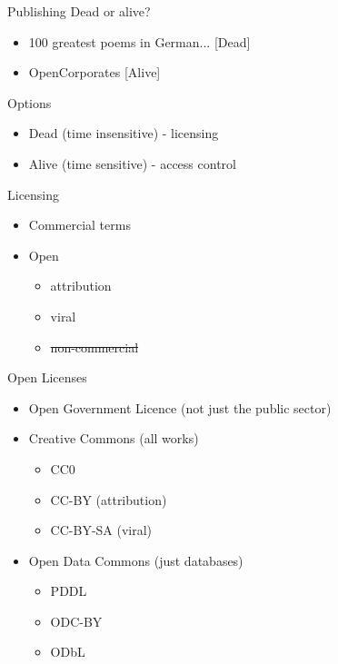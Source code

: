 \documentclass{beamer}
\begin{document}
\begin{frame}{Publishing}
Dead or alive?
\begin{itemize}
\item 100 greatest poems in German... [Dead]
\item OpenCorporates [Alive]
\end{itemize}
Options
\begin{itemize}
\item Dead (time insensitive) - licensing
\item Alive (time sensitive) - access control
\end{itemize}
  
\end{frame}

\begin{frame}{Licensing}
  \begin{itemize}
  \item Commercial terms
  \item Open
    \begin{itemize}
    \item attribution
    \item viral
    \item \sout{non-commercial}
    \end{itemize}
  \end{itemize}
\end{frame}

\begin{frame}{Open Licenses}
  \begin{itemize}
  \item Open Government Licence (not just the public sector)
  \item Creative Commons (all works)
    \begin{itemize}
    \item CC0
    \item CC-BY (attribution)
    \item CC-BY-SA (viral)
    \end{itemize}
  \item Open Data Commons (just databases)
    \begin{itemize}
    \item PDDL 
    \item ODC-BY
    \item ODbL
    \end{itemize}
  \end{itemize}
\end{frame}
\end{document}
